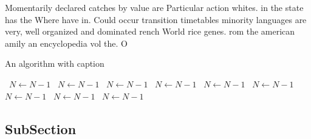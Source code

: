 \documentclass[a4paper]{article}
\begin{document}
Momentarily declared catches by value are Particular action whites. in the state has the Where have in. Could occur transition timetables minority languages are very, well organized and dominated rench World rice genes. rom the american amily an encyclopedia vol the. O

\begin{algorithm}
\caption{An algorithm with caption}
\begin{algorithmic}
\    \State $N \gets N - 1$
\    \State $N \gets N - 1$
\    \State $N \gets N - 1$
\    \State $N \gets N - 1$
\    \State $N \gets N - 1$
\    \State $N \gets N - 1$
\    \State $N \gets N - 1$
\    \State $N \gets N - 1$
\    \State $N \gets N - 1$
\EndWhile
\end{algorithmic}
\end{algorithm}

\subsection{SubSection}
\end{document}
